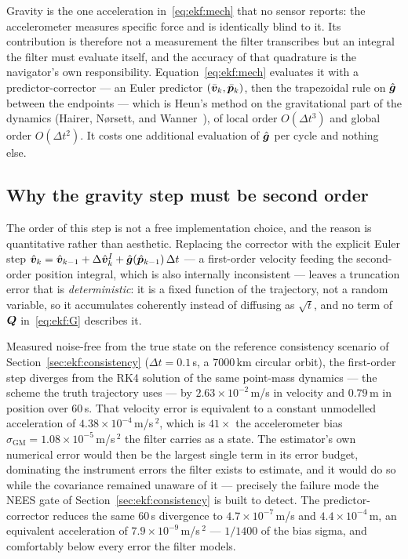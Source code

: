 Gravity is the one acceleration in~\eqref{eq:ekf:mech} that no sensor
reports: the accelerometer measures specific force and is identically
blind to it. Its contribution is therefore not a measurement the filter
transcribes but an integral the filter must evaluate itself, and the
accuracy of that quadrature is the navigator's own responsibility.
Equation~\eqref{eq:ekf:mech} evaluates it with a predictor-corrector
--- an Euler predictor $(\bar{\bm{v}}_k, \bar{\bm{p}}_k)$, then the
trapezoidal rule on $\hat{\bm{g}}$ between the endpoints --- which is
Heun's method on the gravitational part of the dynamics (Hairer,
N\o{}rsett, and Wanner~\cite{hairer1993}), of local order
$O(\Delta t^3)$ and global order $O(\Delta t^2)$. It costs one
additional evaluation of $\hat{\bm{g}}$ per cycle and nothing else.

\subsection{Why the gravity step must be second order}
\label{sec:ekf:gravityorder}

The order of this step is not a free implementation choice, and the
reason is quantitative rather than aesthetic. Replacing the corrector
with the explicit Euler step $\hat{\bm{v}}_k = \hat{\bm{v}}_{k-1} +
\Delta\hat{\bm{v}}^{I}_k + \hat{\bm{g}}(\hat{\bm{p}}_{k-1})\,\Delta t$
--- a first-order velocity feeding the second-order position integral,
which is also internally inconsistent --- leaves a truncation error
that is \emph{deterministic}: it is a fixed function of the trajectory,
not a random variable, so it accumulates coherently instead of
diffusing as $\sqrt{t}$, and no term of $\bm{Q}$
in~\eqref{eq:ekf:G} describes it.

Measured noise-free from the true state on the reference consistency
scenario of Section~\ref{sec:ekf:consistency} ($\Delta t = 0.1$\,s, a
7000\,km circular orbit), the first-order step diverges from the RK4
solution of the same point-mass dynamics --- the scheme the truth
trajectory uses --- by $2.63 \times 10^{-2}$\,m/s in velocity and
$0.79$\,m in position over 60\,s. That velocity error is equivalent to
a constant unmodelled acceleration of $4.38 \times 10^{-4}$\,m/s\,$^2$,
which is $41\times$ the accelerometer bias $\sigma_{\mathrm{GM}} =
1.08 \times 10^{-5}$\,m/s\,$^2$ the filter carries as a state. The
estimator's own numerical error would then be the largest single term
in its error budget, dominating the instrument errors the filter exists
to estimate, and it would do so while the covariance remained unaware
of it --- precisely the failure mode the NEES gate of
Section~\ref{sec:ekf:consistency} is built to detect. The
predictor-corrector reduces the same 60\,s divergence to
$4.7 \times 10^{-7}$\,m/s and $4.4 \times 10^{-4}$\,m, an equivalent
acceleration of $7.9 \times 10^{-9}$\,m/s\,$^2$ --- $1/1400$ of the
bias sigma, and comfortably below every error the filter models.


